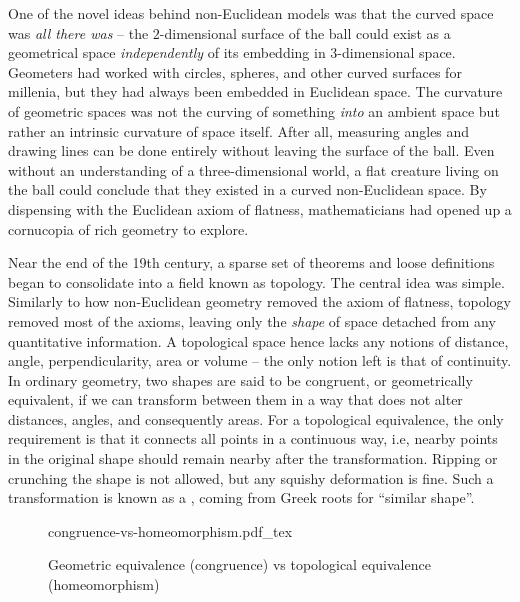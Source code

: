 One of the novel ideas behind non-Euclidean models was that the curved space was \emph{all there was} -- the $2$-dimensional surface of the ball could exist as a geometrical space \emph{independently} of its embedding in $3$-dimensional space.
Geometers had worked with circles, spheres, and other curved surfaces for millenia, but they had always been embedded in Euclidean space.
The curvature of geometric spaces was not the curving of something \emph{into} an ambient space but rather an intrinsic curvature of space itself. After all, measuring angles and drawing lines can be done entirely without leaving the surface of the ball. Even without an understanding of a three-dimensional world, a flat creature living on the ball could conclude that they existed in a curved non-Euclidean space.
By dispensing with the Euclidean axiom of flatness, mathematicians had opened up a cornucopia of rich geometry to explore.
%

Near the end of the 19th century, a sparse set of theorems and loose definitions began to consolidate into a field known as topology. The central idea was simple. Similarly to how non-Euclidean geometry removed the axiom of flatness, topology removed most of the axioms, leaving only the \emph{shape} of space detached from any quantitative information.
A topological space hence lacks any notions of distance, angle, perpendicularity, area or volume -- the only notion left is that of continuity.
In ordinary geometry, two shapes are said to be congruent, or geometrically equivalent, if we can transform between them in a way that does not alter distances, angles, and consequently areas.
For a topological equivalence, the only requirement is that it connects all points in a continuous way, i.e, nearby points in the original shape should remain nearby after the transformation. Ripping or crunching the shape is not allowed, but any squishy deformation is fine. Such a transformation is known as a , coming from Greek roots for ``similar shape''.
\begin{figure}[ht]
	\centering
	{congruence-vs-homeomorphism.pdf_tex}
	\caption{Geometric equivalence (congruence) vs topological equivalence (homeomorphism)}\label{fig:first}
\end{figure}

